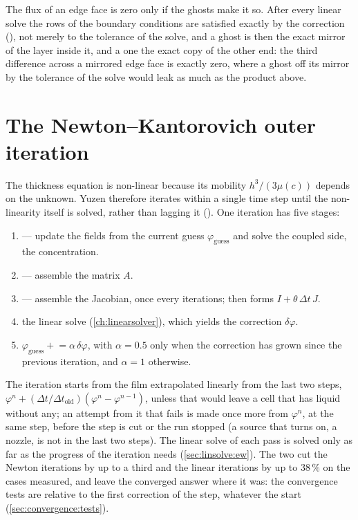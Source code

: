The flux of an edge face is zero only if the ghosts make it so. After every
linear solve the rows of the boundary conditions are satisfied exactly by the
correction (), not merely to the tolerance of
the solve, and a  ghost is then the exact mirror of the layer
inside it, and a  one the exact copy of the other end: the
third difference across a mirrored edge face is exactly zero, where a ghost
off its mirror by the tolerance of the solve would leak as much as the
product above.

\section{The Newton--Kantorovich outer iteration}
\label{sec:time:newton}

The thickness equation is non-linear because its mobility $h^{3}/(3\mu(c))$
depends on the unknown. Yuzen therefore iterates within a single time step
until the non-linearity itself is solved, rather than lagging it
(). One iteration has five stages:

\begin{enumerate}
  \item {} --- update the fields from the current guess
    $\varphi_{\mathrm{guess}}$ and solve the coupled side, the concentration.
  \item {} --- assemble the matrix $A$.
  \item {} --- assemble the Jacobian, once every
     iterations; then  forms
    $I + \theta\,\Delta t\,J$.
  \item the linear solve (\cref{ch:linearsolver}), which yields the correction
    $\delta\varphi$.
  \item $\varphi_{\mathrm{guess}} \mathrel{+}= \alpha\,\delta\varphi$, with
    $\alpha = 0.5$ only when the correction has grown since the previous
    iteration, and $\alpha = 1$ otherwise.
\end{enumerate}

The iteration starts from the film extrapolated linearly from the last two
steps, $\varphi^n + (\Delta t/\Delta t_{\mathrm{old}})(\varphi^n -
\varphi^{n-1})$, unless that would leave a cell that has liquid without any;
an attempt from it that fails is made once more from $\varphi^n$, at the same
step, before the step is cut or the run stopped (a source that turns on, a
nozzle, is not in the last two steps). The linear solve of each pass is
solved only as far as the progress of the iteration needs
(\cref{sec:linsolve:ew}). The two cut the Newton iterations by up to a
third and the linear iterations by up to 38\,\% on the cases measured, and
leave the converged answer where it was: the convergence tests are relative
to the first correction of the step, whatever the start
(\cref{sec:convergence:tests}).


